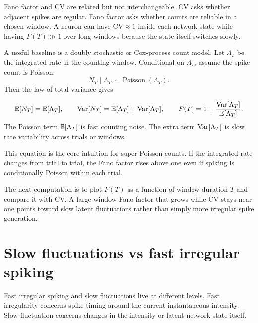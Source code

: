 Fano factor and CV are related but not interchangeable. CV asks whether adjacent spikes are regular. Fano factor asks whether counts are reliable in a chosen window. A neuron can have $\mathrm{CV}\approx 1$ inside each network state while having $F(T)\gg 1$ over long windows because the state itself switches slowly.

A useful baseline is a doubly stochastic or Cox-process count model. Let $\Lambda_T$ be the integrated rate in the counting window. Conditional on $\Lambda_T$, assume the spike count is Poisson:
%
\begin{equation}
  N_T\mid \Lambda_T \sim \operatorname{Poisson}(\Lambda_T).
  \label{eq:cox-count-model}
\end{equation}
%
Then the law of total variance gives
%
\begin{keyequation}
\begin{equation}
  \mathbb{E}[N_T]=\mathbb{E}[\Lambda_T],
  \qquad
  \operatorname{Var}[N_T]=\mathbb{E}[\Lambda_T]+\operatorname{Var}[\Lambda_T],
  \qquad
  F(T)=1+\frac{\operatorname{Var}[\Lambda_T]}{\mathbb{E}[\Lambda_T]}.
  \label{eq:fano-total-variance}
\end{equation}
\tcblower
The Poisson term $\mathbb{E}[\Lambda_T]$ is fast counting noise. The extra term $\operatorname{Var}[\Lambda_T]$ is slow rate variability across trials or windows.
\end{keyequation}

\noindent This equation is the core intuition for super-Poisson counts. If the integrated rate changes from trial to trial, the Fano factor rises above one even if spiking is conditionally Poisson within each trial.

The next computation is to plot $F(T)$ as a function of window duration $T$ and compare it with CV. A large-window Fano factor that grows while CV stays near one points toward slow latent fluctuations rather than simply more irregular spike generation.

\section{Slow fluctuations vs fast irregular spiking}
\label{sec:slow-fluctuations-fast-irregular-spiking}

Fast irregular spiking and slow fluctuations live at different levels. Fast irregularity concerns spike timing around the current instantaneous intensity. Slow fluctuation concerns changes in the intensity or latent network state itself.

